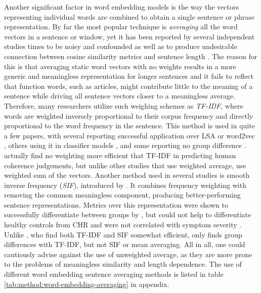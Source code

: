 Another significant factor in word embedding models is the way the vectors representing individual words are combined to obtain a single sentence or phrase representation. By far the most popular technique is \textit{averaging} all the word vectors in a sentence or window, yet it has been reported by several independent studies times to be noisy and confounded \citep{fradkin2023theory} as well as to produce undesirable connection between cosine similarity metrics and sentence length \citep{hitczenko2021understanding, parola2022speech, fradkin2023theory}. The reason for this is that averaging static word vectors with no weights results in a more generic and meaningless representation for longer sentences and it fails to reflect that function words, such as articles, might contribute little to the meaning of a sentence while driving all sentence vectors closer to a meaningless average. Therefore, many researchers utilize such weighing schemes as \textit{TF-IDF}, where words are weighted inversely proportional to their corpus frequency and directly proportional to the word frequency in the sentence. This method is used in quite a few papers, with several reporting successful application over LSA \citep{iter2018automatic} or word2vec \citep{just2019coherence, xu2022fully}, others using it in classifier models \citep{ryazanskaya2020automated, tang2023latent}, and some reporting no group difference \citep{just2020modeling, hitczenko2021understanding}. \citet{xu2020centroid} actually find no weighting more efficient that TF-IDF in predicting human coherence judgements, but unlike other studies that use weighted average,  \citet{xu2020centroid} use weighted sum of the vectors. Another method used in several studies is smooth inverse frequency (\textit{SIF}), introduced by \citet{arora2017simple}. It combines frequency weighting with removing the common meaningless component, producing better-performing sentence representations. Metrics over this representation were shown to successfully differentiate between groups by \citet{iter2018automatic, ryazanskaya2020thesis, morgan2021natural, nettekoven2023semantic}, but could not help to differentiate healthy controls from CHR \citep{hitczenko2021understanding} and were not correlated with symptom severity \citep{iter2018automatic, ryazanskaya2020thesis, hitczenko2021understanding, morgan2021natural}. Unlike \citet{iter2018automatic}, who find both TF-IDF and SIF somewhat efficient, \citet{just2019coherence} only finds group differences with TF-IDF, but not SIF or mean averaging. All in all, one could cautiously advise against the use of unweighted average, as they are more prone to the problems of meaningless similarity and length dependence. The use of different word embedding sentence averaging methods is listed in table \ref{tab:method:word-embedding-averaging} in appendix.

